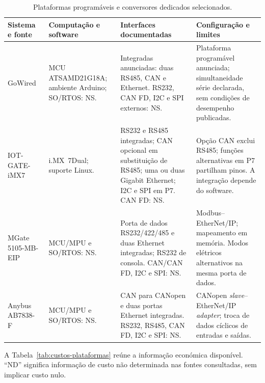 \begin{table}[htbp]
    \centering
    \small
    \setlength{\tabcolsep}{4pt}
    \renewcommand{\arraystretch}{1.12}
    \caption{Plataformas programáveis e conversores dedicados selecionados.}
    \label{tab:plataformas-multiprotocolo}
    \begin{tabularx}{\textwidth}{@{}>{\raggedright\arraybackslash}p{}*{3}{>{\raggedright\arraybackslash}X}@{}}
        \toprule
\rowcolor{LasetTint}
        Sistema e fonte & Computação e software & Interfaces documentadas & Configuração e limites \\
        \midrule
        GoWired~\cite{domatic_gowired}
        & MCU ATSAMD21G18A; ambiente Arduino; SO/RTOS: NS.
        & Integradas anunciadas: duas RS485, CAN e Ethernet.
        RS232, CAN FD, I2C e SPI externos: NS.
        & Plataforma programável anunciada; simultaneidade série declarada,
        sem condições de desempenho publicadas. \\
        \addlinespace
        IOT-GATE-iMX7~\cite{compulab_imx7,compulab_imx7_manual_2018}
        & i.MX~7Dual; suporte Linux.
        & RS232 e RS485 integradas; CAN opcional em substituição de RS485;
        uma ou duas Gigabit Ethernet; I2C e SPI em P7. CAN FD: NS.
        & Opção CAN exclui RS485; funções alternativas em P7 partilham
        pinos. A integração depende do software. \\
        \addlinespace
        MGate 5105-MB-EIP~\cite{moxa_mgate5105}
        & MCU/MPU e SO/RTOS: NS.
        & Porta de dados RS232/422/485 e duas Ethernet integradas;
        RS232 de consola. CAN/CAN FD, I2C e SPI: NS.
        & Modbus--EtherNet/IP; mapeamento em memória.
        Modos elétricos alternativos na mesma porta de dados. \\
        \addlinespace
        Anybus AB7838-F~\cite{hms_ab7838}
        & MCU/MPU e SO/RTOS: NS.
        & CAN para CANopen e duas portas Ethernet integradas.
        RS232, RS485, CAN FD, I2C e SPI: NS.
        & CANopen \textit{slave}--EtherNet/IP \textit{adapter};
        troca de dados cíclicos de entradas e saídas. \\
        \bottomrule
    \end{tabularx}
\end{table}

A Tabela~\ref{tab:custos-plataformas} reúne a informação económica
disponível. \enquote{ND} significa informação de custo não determinada
nas fontes consultadas, sem implicar custo nulo.

